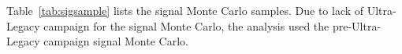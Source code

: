 Table~\ref{tab:sigsample} lists the signal Monte Carlo samples.
Due to lack of Ultra-Legacy campaign for the signal Monte Carlo, the analysis used the pre-Ultra-Legacy campaign signal Monte Carlo.

